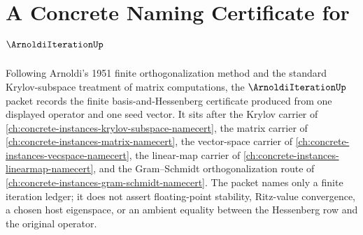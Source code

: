 \chapter{A Concrete Naming Certificate for $\ArnoldiIterationUp$}
\label{ch:concrete-instances-arnoldi-iteration-namecert}

Following Arnoldi's 1951 finite orthogonalization method and the standard Krylov-subspace treatment of matrix computations, the $\ArnoldiIterationUp$ packet records the finite basis-and-Hessenberg certificate produced from one displayed operator and one seed vector. It sits after the Krylov carrier of \autoref{ch:concrete-instances-krylov-subspace-namecert}, the matrix carrier of \autoref{ch:concrete-instances-matrix-namecert}, the vector-space carrier of \autoref{ch:concrete-instances-vecspace-namecert}, the linear-map carrier of \autoref{ch:concrete-instances-linearmap-namecert}, and the Gram--Schmidt orthogonalization route of \autoref{ch:concrete-instances-gram-schmidt-namecert}. The packet names only a finite iteration ledger; it does not assert floating-point stability, Ritz-value convergence, a chosen host eigenspace, or an ambient equality between the Hessenberg row and the original operator.

